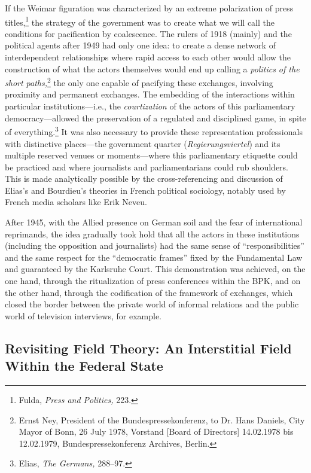 \documentclass{tufte-handout}
\begin{document}
If the Weimar figuration was characterized by an extreme polarization of
press titles,\footnote{Fulda, \emph{Press and Politics,} 223.} the
strategy of the government was to create what we will call the
conditions for pacification by coalescence. The rulers of 1918 (mainly)
and the political agents after 1949 had only one idea: to create a dense
network of interdependent relationships where rapid access to each other
would allow the construction of what the actors themselves would end up
calling a \emph{politics of the short paths,}\footnote{Ernst Ney,
  President of the Bundespressekonferenz, to Dr. Hans Daniels, City
  Mayor of Bonn, 26 July 1978, Vorstand {[}Board of Directors{]}
  14.02.1978 bis 12.02.1979, Bundespressekonferenz Archives, Berlin.}
the only one capable of pacifying these exchanges, involving proximity
and permanent exchanges. The embedding of the interactions within
particular institutions---i.e., the \emph{courtization} of the actors of
this parliamentary democracy---allowed the preservation of a regulated
and disciplined game, in spite of everything.\footnote{Elias, \emph{The
  Germans,} 288--97.} It was also necessary to provide these
representation professionals with distinctive places---the government
quarter (\emph{Regierungsviertel}) and its multiple reserved venues or
moments---where this parliamentary etiquette could be practiced and
where journalists and parliamentarians could rub shoulders. This is made
analytically possible by the cross-referencing and discussion of Elias's
and Bourdieu's theories in French political sociology, notably used by
French media scholars like Erik Neveu.

After 1945, with the Allied presence on German soil and the fear of
international reprimands, the idea gradually took hold that all the
actors in these institutions (including the opposition and journalists)
had the same sense of ``responsibilities'' and the same respect for the
``democratic frames'' fixed by the Fundamental Law and guaranteed by the
Karlsruhe Court. This demonstration was achieved, on the one hand,
through the ritualization of press conferences within the BPK, and on
the other hand, through the codification of the framework of exchanges,
which closed the border between the private world of informal relations
and the public world of television interviews, for example.

\hypertarget{revisiting-field-theory-an-interstitial-field-within-the-federal-state}{%
\subsection{Revisiting Field Theory: An
Interstitial Field Within the Federal
State}\label{revisiting-field-theory-an-interstitial-field-within-the-federal-state}}
\end{document}
